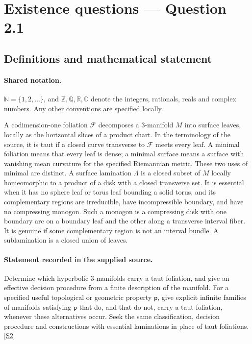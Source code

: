 \documentclass[11pt]{article}
\newcommand{\sref}[2]{\hyperlink{source:#1:#2}{[S#2]}}
\begin{document}
\section{Existence questions — Question 2.1}\label{statement}

\subsection{Definitions and mathematical statement}

\paragraph{Shared notation.}$\mathbb N=\{1,2,\ldots\}$, and $\mathbb Z,\mathbb Q,\mathbb R,\mathbb C$ denote the integers, rationals, reals and complex numbers. Any other conventions are specified locally.


A codimension-one foliation $\mathcal F$ decomposes a $3$-manifold $M$ into surface leaves, locally as the horizontal slices of a product chart. In the terminology of the source, it is taut if a closed curve transverse to $\mathcal F$ meets every leaf. A minimal foliation means that every leaf is dense; a minimal surface means a surface with vanishing mean curvature for the specified Riemannian metric. These two uses of minimal are distinct. A surface lamination $\Lambda$ is a closed subset of $M$ locally homeomorphic to a product of a disk with a closed transverse set. It is essential when it has no sphere leaf or torus leaf bounding a solid torus, and its complementary regions are irreducible, have incompressible boundary, and have no compressing monogon. Such a monogon is a compressing disk with one boundary arc on a boundary leaf and the other along a transverse interval fiber. It is genuine if some complementary region is not an interval bundle. A sublamination is a closed union of leaves.
\paragraph{Statement recorded in the supplied source.}
Determine which hyperbolic $3$-manifolds carry a taut foliation, and give an effective decision procedure from a finite description of the manifold. For a specified useful topological or geometric property $\mathsf p$, give explicit infinite families of manifolds satisfying $\mathsf p$ that do, and that do not, carry a taut foliation, whenever these alternatives occur. Seek the same classification, decision procedure and constructions with essential laminations in place of taut foliations. \sref{statement}{2}
\end{document}

